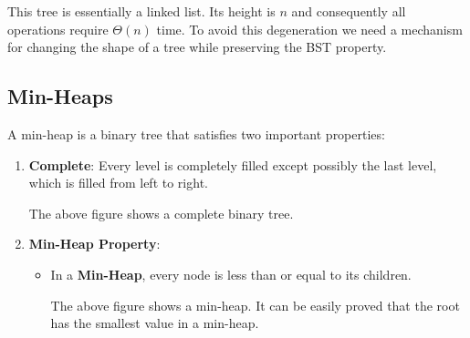 This tree is essentially a linked list. Its height is \(n\) and consequently all operations 
require \(\Theta(n)\) time. To avoid this degeneration we need a 
mechanism for changing the shape of a tree while preserving the BST property.


\subsection{Min-Heaps}

A min-heap is a binary tree that satisfies two important properties:

\begin{enumerate}
\item \textbf{Complete}: Every level is completely filled except possibly the last 
level, which is filled from left to right. 

\begin{center}
\end{center}

The above figure shows a complete binary tree.

\item \textbf{Min-Heap Property}:
\begin{itemize}
\item In a \textbf{Min-Heap}, every node is less than or equal to its children.

\begin{center}
\end{center}

The above figure shows a min-heap. It can be easily proved that the root has the smallest value in a 
min-heap. 

\end{itemize}
\end{enumerate}

